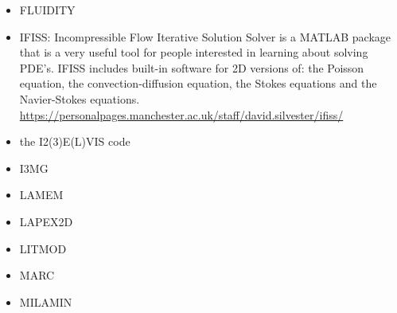\begin{itemize}
\item FLUIDITY
\cite{dawk11}
\cite{gagd14}

\item IFISS: Incompressible Flow Iterative Solution Solver is a
MATLAB package that is a very useful tool for people interested in
learning about solving PDE’s.
IFISS includes built-in software for 2D versions of:
the Poisson equation, the convection-diffusion equation, the Stokes equations
and the Navier-Stokes equations.\\
\url{https://personalpages.manchester.ac.uk/staff/david.silvester/ifiss/}



\item the I2(3)E(L)VIS code

\cite{geyu03}\cite{geyu03b}\cite{geur03}
\cite{geym04}\cite{geys04}\cite{gepm04}
\cite{buge05}
\cite{bbeg06}\cite{gest06}\cite{gogc06}\cite{gecy06}
\cite{geyu07}\cite{gogc07}
\cite{scbe08}\cite{gecy08}\cite{uegs08}\cite{fagc08}\cite{zgyh09}
\cite{gefc09}
\cite{gerya2010}\cite{nigm10}
\cite{dugm11}\cite{dumg11}\cite{lixg11}\cite{gery11}\cite{geme11}
\cite{crsg12}\cite{dugk12}\cite{lixg12}
\cite{lixg13}\cite{nabg13}\cite{magc13}\cite{digd13a}\cite{digd13b}\cite{zhgt13}\cite{dyge13}\cite{gemd13}\cite{mana13}
\cite{dugs14}\cite{puge14}\cite{rugb14}\cite{voge14b}\cite{bagb14}\cite{lige14}\cite{stjm14}\cite{malg14}
\cite{buge14}\cite{gosk14}\cite{bagb14}\cite{vamd14}
\cite{duay15}\cite{uewg15}\cite{rula15}\cite{gesb15}\cite{rula15}
\cite{kobc16}\cite{magc16}\cite{fige16}
\cite{kobg19}

\item I3MG
\cite{facc14}

\item LAMEM
\cite{scbe08}
\cite{kamm10}
\cite{lemk11}
\cite{may12}
\cite{lesh13}
\cite{cokm14}
\cite{feka14a}
\cite{feka14b}
\cite{puka15}
\cite{feka15}
\cite{cofk15}
\cite{kapb16}

\item LAPEX2D
\cite{sopg05}
\cite{bbeg06}
\cite{baso08}
\cite{scbe08}
\cite{sosk11}


\item LITMOD
\cite{fuac09}
\cite{affr08}
\cite{afrf07}
\cite{fufa10}


\item MARC
\cite{nesg97}
\cite{nesb99}


\item MILAMIN
\cite{daks08}
\cite{yakm11}
\cite{gebk12}
\cite{lukz15}
\cite{gehm15}
\cite{thkp15}
\cite{jads16}
\cite{maka16}




\end{itemize}
